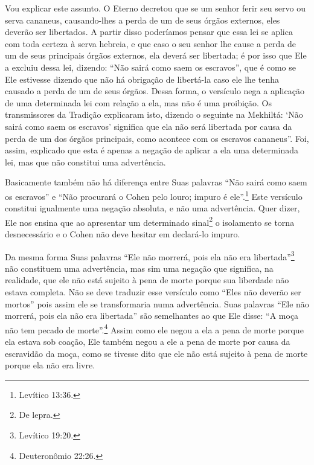 Vou explicar este assunto. O Eterno decretou que se um senhor ferir seu
servo ou serva cananeus, causando-lhes a perda de um de seus órgãos
externos, eles deverão ser libertados. A partir disso poderíamos pensar
que essa lei se aplica com toda certeza à serva hebreia, e que caso o
seu senhor lhe cause a perda de um de seus principais órgãos externos,
ela deverá ser libertada; é por isso que Ele a excluiu dessa lei,
dizendo: ``Não sairá como saem os escravos'', que é como se Ele
estivesse dizendo que não há obrigação de libertá-la caso ele lhe tenha
causado a perda de um de seus órgãos. Dessa forma, o versículo nega a
aplicação de uma determinada lei com relação a ela, mas não é uma
proibição. Os transmissores da Tradição explicaram isto, dizendo o
seguinte na Mekhiltá: `Não sairá como saem os escravos' significa que
ela não será libertada por causa da perda de um dos órgãos principais,
como acontece com os escravos cananeus''. Foi, assim, explicado que esta
é apenas a negação de aplicar a ela uma determinada lei, mas que não
constitui uma advertência.

Basicamente também não há diferença entre Suas palavras ``Não sairá como saem os escravos'' e ``Não procurará o Cohen pelo louro;
impuro
é ele''.\footnote{Levítico 13:36.} Este versículo constitui igualmente uma
negação absoluta, e não uma advertência. Quer dizer, Ele nos ensina que ao
apresentar um determinado sinal\footnote{De lepra.} o isolamento se
torna desnecessário e o Cohen não deve hesitar em declará-lo impuro.

Da mesma forma Suas palavras ``Ele não morrerá, pois ela não era
libertada''\footnote{Levítico 19:20.} não constituem uma advertência, mas sim uma
negação que significa, na realidade, que ele não está sujeito à pena de
morte porque sua liberdade não estava completa. Não se deve traduzir
esse versículo como ``Eles não deverão ser mortos'' pois assim ele se
transformaria numa advertência. Suas palavras ``Ele não morrerá, pois
ela não era libertada'' são semelhantes ao que Ele disse: ``A moça não tem pecado de morte''.\footnote{Deuteronômio 22:26.} Assim como ele negou a ela a pena de morte porque
ela estava sob coação, Ele também negou a ele a pena de morte por causa
da escravidão da moça, como se tivesse dito que ele não está sujeito à
pena de morte porque ela não era livre.

